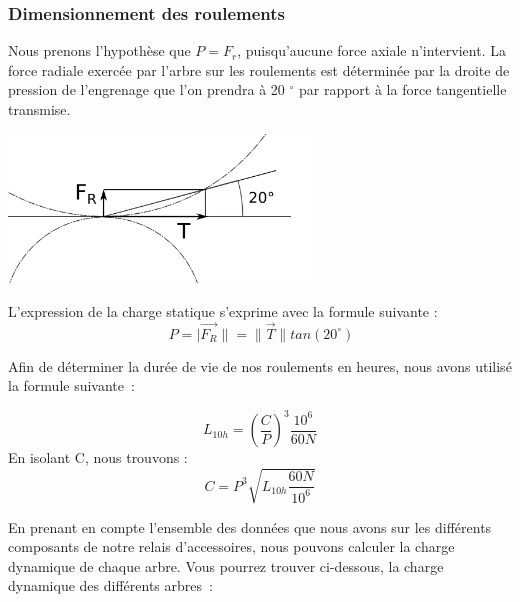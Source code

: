 \documentclass{config}
\begin{document}
\begin{spacing}{1.2}
\subsubsection{Dimensionnement des roulements}

Nous prenons l'hypothèse que $P = F_r$, puisqu'aucune force axiale n'intervient.
La force radiale exercée par l'arbre sur les roulements est déterminée par la droite de pression de l'engrenage que l'on prendra à 20 $^\circ{}$ par rapport à la force tangentielle transmise.

\begin{center}
\includegraphics[width=0.6\textwidth]{Droite_de_pression.png}
\end{center}

L'expression de la charge statique s'exprime avec la formule suivante :
\[\ P = | \vec{F_R} \| = \| \vec{T} \| tan(20^\circ{})\]

Afin de déterminer la durée de vie de nos roulements en heures, nous avons utilisé la formule suivante :

\[L_{10h} = (\frac{C}{P})^3 \frac{10^6}{60N}  \]
En isolant C, nous trouvons :
\[C = P^3\sqrt{L_{10h} \frac{60N}{10^6}}  \]

En prenant en compte l'ensemble des données que nous avons sur les différents composants de notre relais d'accessoires, nous pouvons calculer la charge dynamique de chaque arbre. Vous pourrez trouver ci-dessous, la charge dynamique des différents arbres :

\begin{table}[h!]
\centering
{}
\end{table}
\newpage


\end{spacing}
\end{document}
